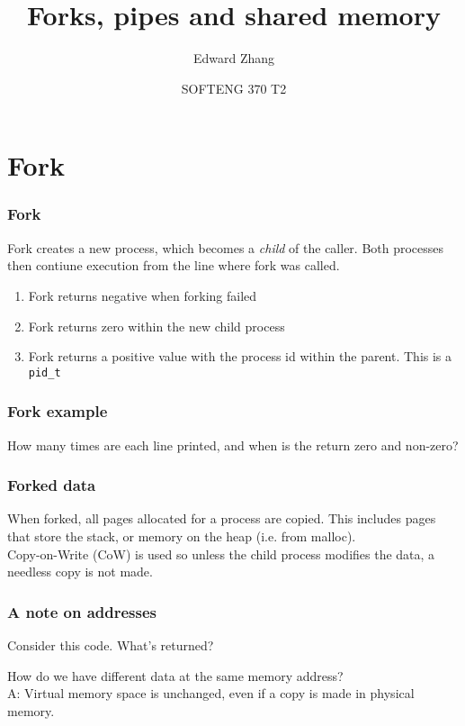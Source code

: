 \documentclass{beamer}
\title[SOFTENG 370 Tutorial 2 (2019)] %
{Forks, pipes and shared memory}
\author{Edward Zhang}
\date[August 2019] %
{SOFTENG 370 T2}
\begin{document}
\frame{\titlepage}
\section{Fork}
\begin{frame}
  \frametitle{Fork}
  Fork creates a new process, which becomes a \emph{child} of the caller. Both processes then contiune execution from the line where fork was called.
  \begin{enumerate}
    \item Fork returns negative when forking failed
    \item Fork returns zero within the new child process
    \item Fork returns a positive value with the process id within the parent. This is a \texttt{pid\_t}
  \end{enumerate}
\end{frame}
\begin{frame}
  \frametitle{Fork example}
  
  How many times are each line printed, and when is the return zero and non-zero?
\end{frame}
\begin{frame}
  \frametitle{Forked data}
  When forked, all pages allocated for a process are copied. This includes pages that store the stack, or memory on the heap (i.e. from malloc).\\
  Copy-on-Write (CoW) is used so unless the child process modifies the data, a needless copy is not made.

\end{frame}
\begin{frame}
  \frametitle{A note on addresses}
  Consider this code. What's returned?
  
  \pause
  How do we have different data at the same memory address?\\
  \pause
  A: Virtual memory space is unchanged, even if a copy is made in physical memory.
\end{frame}
\end{document}
